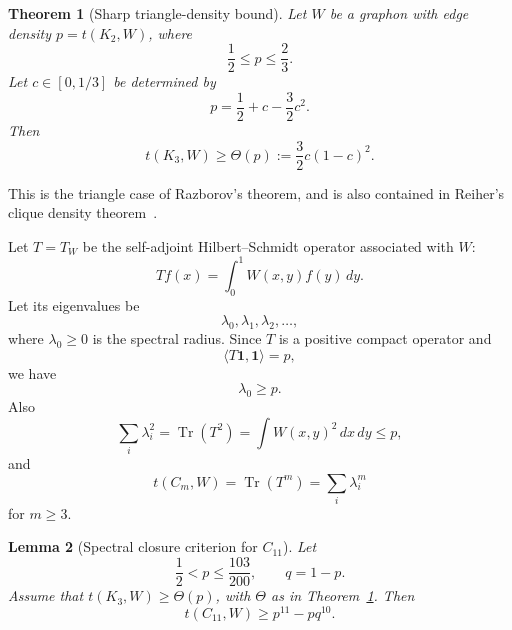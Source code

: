\documentclass[11pt]{article}
\newtheorem{theorem}{Theorem}[section]
\newtheorem{lemma}[theorem]{Lemma}
\newcommand{\one}{\mathbf 1}
\DeclareMathOperator{\Tr}{Tr}
\begin{document}
\begin{theorem}[Sharp triangle-density bound]\label{thm:triangle}
Let $W$ be a graphon with edge density $p=t(K_2,W)$, where
\[
        \frac12\le p\le\frac23.
\]
Let $c\in[0,1/3]$ be determined by
\[
        p=\frac12+c-\frac32c^2.
\]
Then
\[
        t(K_3,W)\ge \Theta(p):=\frac32c(1-c)^2.
\]
\end{theorem}

This is the triangle case of Razborov's theorem, and is also contained in Reiher's clique density theorem~\cite{RazborovTriangles,ReiherCliqueDensity}.

Let $T=T_W$ be the self-adjoint Hilbert--Schmidt operator associated with $W$:
\[
        Tf(x)=\int_0^1 W(x,y)f(y)\,dy.
\]
Let its eigenvalues be
\[
        \lambda_0,\lambda_1,\lambda_2,\ldots,
\]
where $\lambda_0\ge0$ is the spectral radius.  Since $T$ is a positive compact operator and
\[
        \langle T\one,\one\rangle=p,
\]
we have
\[
        \lambda_0\ge p.
\]
Also
\[
        \sum_i\lambda_i^2=\Tr(T^2)=\int W(x,y)^2\,dx\,dy\le p,
\]
and
\[
        t(C_m,W)=\Tr(T^m)=\sum_i\lambda_i^m
\]
for $m\ge3$.

\begin{lemma}[Spectral closure criterion for $C_{11}$]\label{lem:spectral-closure}
Let
\[
        \frac12<p\le\frac{103}{200},
        \qquad q=1-p.
\]
Assume that $t(K_3,W)\ge\Theta(p)$, with $\Theta$ as in Theorem~\ref{thm:triangle}.  Then
\[
        t(C_{11},W)\ge p^{11}-pq^{10}.
\]
\end{lemma}
\end{document}

